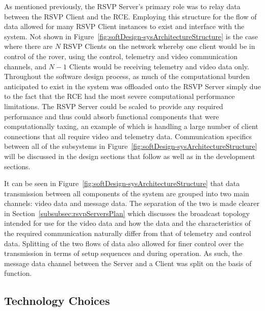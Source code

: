       As mentioned previously, the RSVP Server's primary role was to relay data between the RSVP Client and the RCE. Employing this structure for the flow of data allowed for many RSVP Client instances to exist and interface with the system. Not shown in Figure~\ref{fig:softDesign-sysArchitectureStructure} is the case where there are $N$ RSVP Clients on the network whereby one client would be in control of the rover, using the control, telemetry and video communication channels, and $N-1$ Clients would be receiving telemetry and video data only. Throughout the software design process, as much of the computational burden anticipated to exist in the system was offloaded onto the RSVP Server simply due to the fact that the RCE had the most severe computational performance limitations. The RSVP Server could be scaled to provide any required performance and thus could absorb functional components that were computationally taxing, an example of which is handling a large number of client connections that all require video and telemetry data. Communication specifics between all of the subsystems in Figure~\ref{fig:softDesign-sysArchitectureStructure} will be discussed in the design sections that follow as well as in the development sections.
      
      It can be seen in Figure~\ref{fig:softDesign-sysArchitectureStructure} that data transmission between all components of the system are grouped into two main channels: video data and message data. The separation of the two is made clearer in Section~\ref{subsubsec:rsvpServersPlan} which discusses the broadcast topology intended for use for the video data and how the data and the characteristics of the required communication naturally differ from that of telemetry and control data. Splitting of the two flows of data also allowed for finer control over the transmission in terms of setup sequences and during operation. As such, the message data channel between the Server and a Client was split on the basis of function.
      
  \subsection{Technology Choices}
